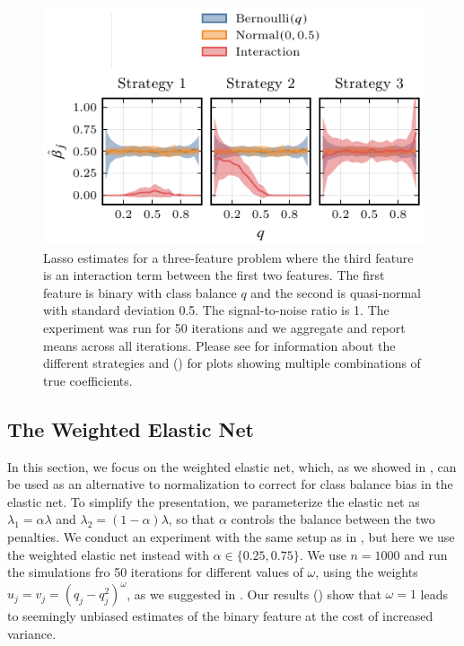 \begin{figure}[htpb]
  \centering
  \includegraphics[]{plots/interactions-classbalance-small.pdf}
  \caption{%
    Lasso estimates for a three-feature problem where the third feature is an
    interaction term between the first two features. The first feature is
    binary with class balance \(q\) and the second is quasi-normal with
    standard deviation 0.5. The signal-to-noise ratio is 1. The experiment was
    run for 50 iterations and we aggregate and report means across all
    iterations. Please see  for information
    about the different strategies and 
    () for plots showing multiple
    combinations of true coefficients.
  }
  \label{fig:interactions}
\end{figure}

\subsection{The Weighted Elastic Net}\label{sec:experiments-elasticnet}

In this section, we focus on the weighted elastic net, which, as we showed in
, can be used as an alternative to normalization to correct
for class balance bias in the elastic net. To simplify the presentation, we parameterize
the elastic net as \(\lambda_1 = \alpha \lambda \) and \(\lambda_2 = (1-\alpha) \lambda\),
so that \(\alpha\) controls the balance between the two penalties. We conduct an experiment
with the same setup as in , but here we use the weighted
elastic net instead with \(\alpha \in \{0.25, 0.75\}\). We use \(n=1000\) and run the
simulations fro 50 iterations for different values of \(\omega\), using the weights \(u_j =
v_j = (q_j - q_j^2)^{\omega}\), as we suggested in . Our results
() show that \(\omega = 1\) leads to seemingly unbiased
estimates of the binary feature at the cost of increased variance.

